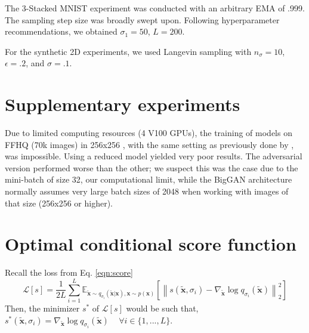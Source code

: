 \documentclass{article} \usepackage{iclr2021_conference_notitle,times}
\theoremstyle{definition}
\theoremstyle{definition}
\newcommand{\norm}[1]{\left\lVert#1\right\rVert}
\begin{document}
The 3-Stacked MNIST experiment was conducted with an arbitrary EMA of .999. The sampling step size was broadly swept upon. Following \citep{song2020improved} hyperparameter recommendations, we obtained $\sigma_1=50$, $L=200$.

For the synthetic 2D experiments, we used Langevin sampling with $n_\sigma=10$, $\epsilon = .2$, and $\sigma=.1$.

\section{Supplementary experiments}
\label{app:B}

Due to limited computing resources (4 V100 GPUs), the training of models on FFHQ (70k images) in 256x256 \citep{karras2019style}, with the same setting as previously done by \citet{song2020improved}, was impossible. Using a reduced model yielded very poor results. The adversarial version performed worse than the other; we suspect this was the case due to the mini-batch of size 32, our computational limit, while the BigGAN architecture normally assumes very large batch sizes of 2048 when working with images of that size (256x256 or higher). 

\section{Optimal conditional score function}
\label{app:C}

Recall the loss from Eq. \ref{eqn:score}
\[\mathcal{L}[s] = \frac{1}{2L}\sum_{i=1}^L \mathbb{E}_{\boldsymbol{\tilde{x}} \sim q_{\sigma_i}(\boldsymbol{\tilde{x}}|\boldsymbol{x}), \boldsymbol{x} \sim p(\boldsymbol{x})}\left[ \norm{ s(\boldsymbol{\tilde{x}}, \sigma_i) - \nabla_{\boldsymbol{\tilde{x}}} \log q_{\sigma_i}(\boldsymbol{\tilde{x}}) }_2^2 \right] \]
Then, the minimizer $s^*$ of $\mathcal{L}[s]$ would be such that, $s^{*}(\boldsymbol{\tilde{x}}, \sigma_i) = \nabla_{\boldsymbol{\tilde{x}}} \log q_{\sigma_i}(\boldsymbol{\tilde{x}})$ ~ $\forall i \in \{1, ..., L\}$.
\end{document}
